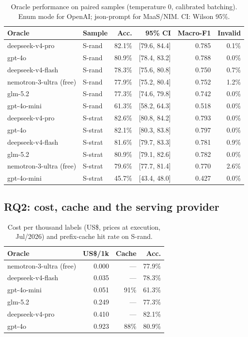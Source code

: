 \documentclass[11pt]{article}
\begin{document}
\begin{table}[htb]
\centering
\caption{Oracle performance on paired samples (temperature 0, calibrated
batching). Enum mode for OpenAI; json-prompt for MaaS/NIM. CI: Wilson 95\%.}
\label{tab:main}
\small
\begin{tabular}{llrrrr}
\toprule
\textbf{Oracle} & \textbf{Sample} & \textbf{Acc.} & \textbf{95\% CI} &
\textbf{Macro-F1} & \textbf{Invalid} \\
\midrule
deepseek-v4-pro   & S-rand  & 82.1\% & [79.6, 84.4] & 0.785 & 0.1\% \\
gpt-4o            & S-rand  & 80.9\% & [78.4, 83.2] & 0.788 & 0.0\% \\
deepseek-v4-flash & S-rand  & 78.3\% & [75.6, 80.8] & 0.750 & 0.7\% \\
nemotron-3-ultra (free) & S-rand & 77.9\% & [75.2, 80.4] & 0.752 & 1.2\% \\
glm-5.2           & S-rand  & 77.3\% & [74.6, 79.8] & 0.742 & 0.0\% \\
gpt-4o-mini       & S-rand  & 61.3\% & [58.2, 64.3] & 0.518 & 0.0\% \\
\midrule
deepseek-v4-pro   & S-strat & 82.6\% & [80.8, 84.2] & 0.793 & 0.0\% \\
gpt-4o            & S-strat & 82.1\% & [80.3, 83.8] & 0.797 & 0.0\% \\
deepseek-v4-flash & S-strat & 81.6\% & [79.7, 83.3] & 0.781 & 0.9\% \\
glm-5.2           & S-strat & 80.9\% & [79.1, 82.6] & 0.782 & 0.0\% \\
nemotron-3-ultra (free) & S-strat & 79.6\% & [77.7, 81.4] & 0.770 & 2.6\% \\
gpt-4o-mini       & S-strat & 45.7\% & [43.4, 48.0] & 0.427 & 0.0\% \\
\bottomrule
\end{tabular}
\end{table}

\subsection{RQ2: cost, cache and the serving provider}

\begin{table}[htb]
\centering
\caption{Cost per thousand labels (US\$, prices at execution, Jul/2026)
and prefix-cache hit rate on S-rand.}
\label{tab:cost}
\small
\begin{tabular}{lrrr}
\toprule
\textbf{Oracle} & \textbf{US\$/1k} & \textbf{Cache} & \textbf{Acc.} \\
\midrule
nemotron-3-ultra (free) & 0.000 & ---  & 77.9\% \\
deepseek-v4-flash & 0.035 & ---  & 78.3\% \\
gpt-4o-mini       & 0.051 & 91\% & 61.3\% \\
glm-5.2           & 0.249 & ---  & 77.3\% \\
deepseek-v4-pro   & 0.410 & ---  & 82.1\% \\
gpt-4o            & 0.923 & 88\% & 80.9\% \\
\bottomrule
\end{tabular}
\end{table}
\end{document}

